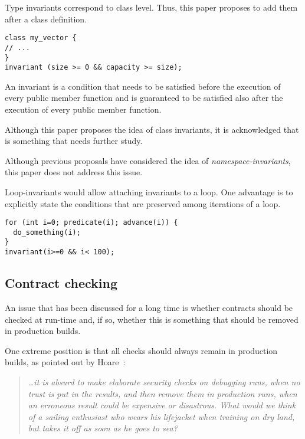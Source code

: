 
Type invariants correspond to class level. Thus, this paper proposes to add them
after a class definition.

\begin{lstlisting}
class my_vector {
// ...
}
invariant (size >= 0 && capacity >= size);
\end{lstlisting}

An invariant is a condition that needs to be satisfied before the execution of
every public member function and is guaranteed to be satisfied also after the
execution of every public member function.

Although this paper proposes the idea of class invariants, it is acknowledged
that is something that needs further study.


Although previous proposals have considered the idea of
\emph{namespace-invariants}, this paper does not address this issue.


Loop-invariants would allow attaching invariants to a loop. One advantage is to
explicitly state the conditions that are preserved among iterations of a loop.

\begin{lstlisting}
for (int i=0; predicate(i); advance(i)) {
  do_something(i);
}
invariant(i>=0 && i< 100);
\end{lstlisting}


\subsection{Contract checking}

An issue that has been discussed for a long time is whether contracts should be
checked at run-time and, if so, whether this is something that should be removed
in production builds.

One extreme position is that all checks should always remain in production
builds, as pointed out by Hoare~\cite{hoare:1973}:

\begin{quote}
\emph{
\ldots it is
absurd to make elaborate security checks on debugging runs, when no
trust is put in the results, and then remove them in production runs,
when an erroneous result could be expensive or disastrous. What would
we think of a sailing enthusiast who wears his lifejacket when training
on dry land, but takes it off as soon as he goes to sea?
}
\end{quote}


